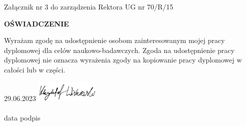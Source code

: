 \documentclass[11pt, a4paper]{article}
\begin{document}
  \newpage


  \begin{sloppypar}
    \raggedleft \normalsize Załącznik nr 3 do zarządzenia Rektora UG nr 70/R/15

    \vspace{2.5cm}


    \centering
    \Large \textbf{OŚWIADCZENIE}

    \vspace{2.5cm}


    Wyrażam zgodę na udostępnienie osobom zainteresowanym mojej pracy dyplomowej dla
    celów naukowo-badawczych. Zgoda na udostępnienie pracy dyplomowej nie oznacza wyrażenia
    zgody na kopiowanie pracy dyplomowej w całości lub w części.

    \vspace{2.5cm}
    \centering


    \hspace{1.2cm} 29.06.2023 \hspace{6.5cm}
    \includegraphics[height=1cm]{"resources/signature.jpg"}
    \hspace{3.5cm} \\ \hspace{0.7cm} \dotfill \hspace{3cm} \dotfill \hspace{1cm} \\
    \hspace{1cm} \small{data} \hspace{8cm} \small{podpis}
  \end{sloppypar}

  \newpage
\end{document}
